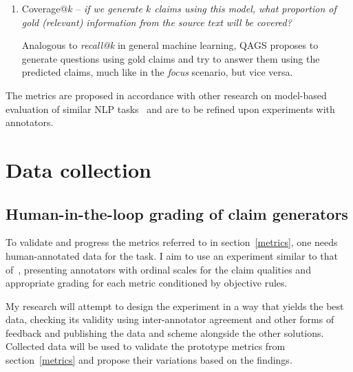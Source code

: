 \begin{enumerate}
    An elegant and functional perspective on the problem has been brought around in QAGS\footnote{Pronounced \"{kags}, stands for \"{Question Answering and Generation for Summarization}} evaluation protocol~\cite{wang-etal-2020-asking}, where the idea is to use a Question Generation model (QG) to formulate questions in natural language based on all $k$ predicted claims. The questions are then twice answered using a Question Answering (QA) model, giving it knowledge from (i.) the predicted claims (ii.) the gold claims written by a human.
    The focus is then defined as the proportion of questions with the same answers extracted from the gold and predicted claims among all questions the model can generate from the predicted claims. 

    \item {\techbf Coverage}$@k$ -- \textit{if we generate $k$ claims using this model, what proportion of gold (relevant) information from the source text will be covered?}
    
    Analogous to \textit{recall@k} in general machine learning, QAGS proposes to generate questions using gold claims and try to answer them using the predicted claims, much like in the \textit{focus} scenario, but vice versa.
\end{enumerate}
The metrics are proposed in accordance with other research on model-based evaluation of similar NLP tasks~\cite{ffci,wright} and are to be refined upon experiments with annotators.

\section{Data collection}
\subsection{Human-in-the-loop grading of claim generators}
To validate and progress the metrics referred to in section~\ref{metrics}, one needs human-annotated data for the task.
I aim to use an experiment similar to that of~\cite{wright}, presenting annotators with ordinal scales for the claim qualities and appropriate grading for each metric conditioned by objective rules.

My research will attempt to design the experiment in a way that yields the best data, checking its validity using inter-annotator agreement and other forms of feedback and publishing the data and scheme alongside the other solutions. 
Collected data will be used to validate the prototype metrics from section~\ref{metrics} and propose their variations based on the findings.

